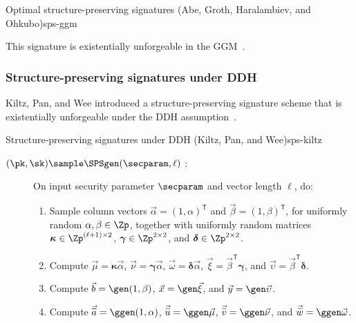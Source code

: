 \begin{primitivebox}{Optimal structure-preserving signatures (Abe, Groth,
  Haralambiev, and Ohkubo)}{sps-ggm}
\begin{description}
  \end{description}

\end{primitivebox}

This signature is existentially unforgeable in the GGM~\cite{C:AGHO11}.

\subsubsection{Structure-preserving signatures under DDH}\label{sec:sps-kiltz}

Kiltz, Pan, and Wee introduced a structure-preserving signature scheme that is
existentially unforgeable under the DDH assumption~\cite{C:KilPanWee15}.

\begin{primitivebox}{Structure-preserving signatures under DDH (Kiltz, Pan, and
  Wee)}{sps-kiltz}

  \begin{description}

    \item[$(\pk, \sk) \sample \SPSgen(\secparam, \ell)$ :] On input security
      parameter $\secparam$ and vector length $\ell$, do:

      \begin{enumerate}

        \item Sample column vectors $\vec{\alpha} = (1, \alpha)^{\mathsf{T}}$
          and $\vec{\beta} = (1, \beta)^{\mathsf{T}}$, for uniformly random
          $\alpha, \beta \in \Zp$, together with uniformly random matrices
          $\boldsymbol{\kappa} \in \Zp^{(\ell+1)\times 2}$,
          $\boldsymbol{\gamma} \in \Zp^{2\times 2}$, and $\boldsymbol{\delta}
          \in \Zp^{2\times 2}$.

        \item Compute $\vec{\mu} = \boldsymbol{\kappa}\vec{\alpha}$, $\vec{\nu}
          = \boldsymbol{\gamma}\vec{\alpha}$, $\vec{\omega} =
          \boldsymbol{\delta}\vec{\alpha}$, $\vec{\xi} =
          \vec{\beta}^{\mathsf{T}}\boldsymbol{\gamma}$, and $\vec{\upsilon} =
          \vec{\beta}^{\mathsf{T}}\boldsymbol{\delta}$.

        \item Compute $\vec{{b}} = \gen(1, \beta)$, $\vec{{x}} =
          \gen\vec{\xi}$, and $\vec{{y}} = \gen\vec{\upsilon}$.

        \item Compute $\vec{\widetilde{a}} = \ggen(1, \alpha)$,
          $\vec{\widetilde{u}} = \ggen\vec{\mu}$, $\vec{\widetilde{v}} =
          \ggen\vec{\nu}$, and $\vec{\widetilde{w}} = \ggen\vec{\omega}$.


\end{enumerate}
\end{description}
\end{primitivebox}
